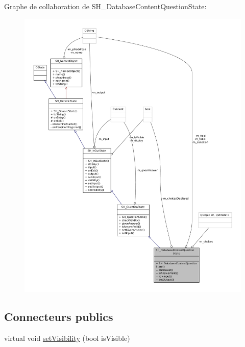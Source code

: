 Graphe de collaboration de S\-H\-\_\-\-Database\-Content\-Question\-State\-:
\nopagebreak
\begin{figure}[H]
\begin{center}
\leavevmode
\includegraphics[width=350pt]{classSH__DatabaseContentQuestionState__coll__graph}
\end{center}
\end{figure}
\subsection*{Connecteurs publics}
\begin{DoxyCompactItemize}
\item 
virtual void \hyperlink{classSH__InOutState_a7706a2ea1367ab3416db27fa0f4794f7}{set\-Visibility} (bool is\-Visible)
\end{DoxyCompactItemize}
